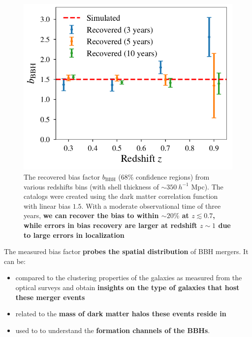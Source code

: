 \documentclass[a1,portrait]{a1poster}
\begin{document}
\begin{textblock}{7.3}
\begin{figure}[t]
	\centering
	\includegraphics[scale=0.73]{moneyplot.png}
	\caption{\small{The recovered bias factor $b_\mathrm{BBH}$ ({68\%} confidence regions) from various redshifts bins (with shell thickness of $\sim 350~h^{-1}$ Mpc). The catalogs were created using the dark matter correlation function with  linear bias $1.5$. With a moderate observational time of three years, \textbf{we can recover the bias to within $\sim 20\%$ at $z \lesssim 0.7$, while errors in bias recovery are larger at redshift $z \sim 1$ due to large errors in localization}}}
\end{figure}
The measured bias factor \textbf{probes the spatial distribution} of BBH mergers. It can be:
\begin{itemize}
	\item compared to the clustering properties of the galaxies as measured from the optical surveys  and obtain \textbf{insights on the type of galaxies that host these merger events}
	\item related to the \textbf{mass of dark matter halos these events reside in}
	\item used to to understand the \textbf{formation channels of the BBHs}.
\end{itemize}
\end{textblock}
\end{document}
